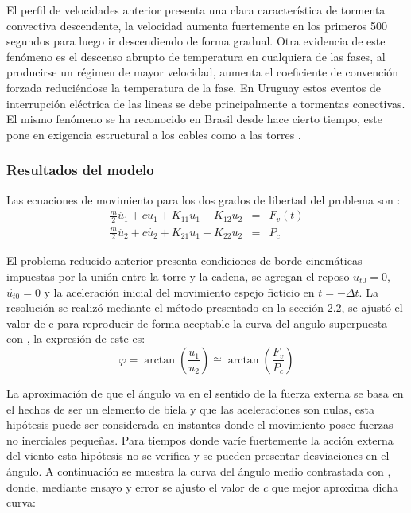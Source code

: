 El perfil de velocidades anterior presenta una clara característica de tormenta convectiva descendente, la velocidad aumenta fuertemente en los primeros 500 segundos para luego ir descendiendo de forma gradual. Otra evidencia de este fenómeno es el descenso abrupto de temperatura en cualquiera de las fases, al producirse un régimen de mayor velocidad, aumenta el coeficiente de convención forzada reduciéndose la temperatura de la fase.  En Uruguay estos eventos de interrupción eléctrica de las lineas se debe principalmente a tormentas conectivas. El mismo fenómeno se ha reconocido en Brasil desde hace cierto tiempo, este pone en exigencia estructural a los cables como a las torres \cite{Riera2012}.

\subsubsection{Resultados del modelo}
Las ecuaciones de movimiento para los dos grados de libertad del problema son : 
\begin{eqnarray}
	\frac{m}{2}\ddot{u_1}  +c\dot{u_1}+K_{11}u_1+K_{12}u_2&=&F_v(t)\\
	\frac{m}{2}\ddot{u_2}  +c\dot{u_2}+K_{21}u_1+K_{22}u_2&=&P_c
\end{eqnarray}




El problema reducido anterior presenta condiciones de borde cinemáticas impuestas por la unión entre la torre y la cadena, se agregan el reposo $ {u_{t0}}=0 $, $\dot{u_{t0}}=0$ y la aceleración inicial del movimiento espejo ficticio en $t =-\Delta t $. La resolución se realizó mediante el método presentado en la sección 2.2, se ajustó el valor de c para reproducir de forma aceptable la curva del angulo superpuesta con \cite{stengel2017measurements}, la expresión de este es: 
\begin{equation}
	\varphi =\arctan\left ( \frac{u_1}{u_2} \right ) \cong \arctan\left ( \frac{F_v}{P_c} \right ) 
\end{equation}

La aproximación de que el ángulo va en el sentido de la fuerza externa se basa en el hechos de ser un elemento de biela y que las aceleraciones son nulas, esta hipótesis puede ser considerada en instantes donde el movimiento posee fuerzas no inerciales pequeñas. Para tiempos donde varíe fuertemente la acción externa del viento esta hipótesis no se verifica y se pueden presentar desviaciones en el ángulo. A continuación se muestra  la curva del ángulo medio contrastada con \cite{stengel2017measurements}, donde, mediante ensayo y error se ajusto el valor de $c$ que mejor aproxima dicha curva:


